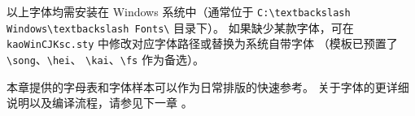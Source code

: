 \begin{kaobox}[title=字体要求]
以上字体均需安装在 Windows 系统中（通常位于 \lstinline|C:\textbackslash Windows\textbackslash Fonts\| 目录下）。
如果缺少某款字体，可在 \texttt{kaoWinCJKsc.sty} 中修改对应字体路径或替换为系统自带字体
（模板已预置了 \texttt{\textbackslash song}、\texttt{\textbackslash hei}、%
\texttt{\textbackslash kai}、\texttt{\textbackslash fs} 作为备选）。
\end{kaobox}

本章提供的字母表和字体样本可以作为日常排版的快速参考。
关于字体的更详细说明以及编译流程，请参见下一章
。

